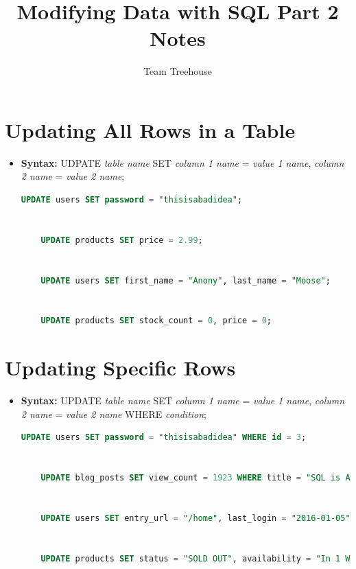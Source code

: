 \documentclass[12pt]{article}
\begin{document}
\title{Modifying Data with SQL Part 2 Notes}
\author{Team Treehouse}
\maketitle

\bigskip

\section{Updating All Rows in a Table}

\bigskip

\begin{itemize}
    \item \textbf{Syntax:} UDPATE \textit{table name} SET \textit{column 1 name} = \textit{value 1 name}, \textit{column 2 name} = \textit{value 2 name};

    \begin{lstlisting}[language=SQL]
    UPDATE users SET password = "thisisabadidea";


    UPDATE products SET price = 2.99;


    UPDATE users SET first_name = "Anony", last_name = "Moose";


    UPDATE products SET stock_count = 0, price = 0;
    \end{lstlisting}
\end{itemize}


\bigskip

\section{Updating Specific Rows}

\bigskip

\begin{itemize}
    \item \textbf{Syntax:} UPDATE \textit{table name} SET \textit{column 1 name} = \textit{value 1 name}, \textit{column 2 name} = \textit{value 2 name} WHERE \textit{condition};

    \begin{lstlisting}[language=SQL]
    UPDATE users SET password = "thisisabadidea" WHERE id = 3;


    UPDATE blog_posts SET view_count = 1923 WHERE title = "SQL is Awesome";


    UPDATE users SET entry_url = "/home", last_login = "2016-01-05" WHERE id = 329;


    UPDATE products SET status = "SOLD OUT", availability = "In 1 Week" WHERE stock_count = 0;
    \end{lstlisting}
\end{itemize}
\end{document}
